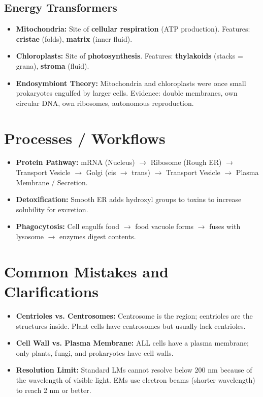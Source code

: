 \documentclass[11pt, a4paper]{article}
\begin{document}
\subsection*{Energy Transformers}
\begin{itemize}
    \item \textbf{Mitochondria:} Site of \textbf{cellular respiration} (ATP production). Features: \textbf{cristae} (folds), \textbf{matrix} (inner fluid).
    \item \textbf{Chloroplasts:} Site of \textbf{photosynthesis}. Features: \textbf{thylakoids} (stacks = grana), \textbf{stroma} (fluid).
    \item \textbf{Endosymbiont Theory:} Mitochondria and chloroplasts were once small prokaryotes engulfed by larger cells. Evidence: double membranes, own circular DNA, own ribosomes, autonomous reproduction.
\end{itemize}

\section*{Processes / Workflows}
\begin{itemize}
    \item \textbf{Protein Pathway:} mRNA (Nucleus) $\rightarrow$ Ribosome (Rough ER) $\rightarrow$ Transport Vesicle $\rightarrow$ Golgi (cis $\rightarrow$ trans) $\rightarrow$ Transport Vesicle $\rightarrow$ Plasma Membrane / Secretion.
    \item \textbf{Detoxification:} Smooth ER adds hydroxyl groups to toxins to increase solubility for excretion.
    \item \textbf{Phagocytosis:} Cell engulfs food $\rightarrow$ food vacuole forms $\rightarrow$ fuses with lysosome $\rightarrow$ enzymes digest contents.
\end{itemize}

\section*{Common Mistakes and Clarifications}
\begin{itemize}
    \item \textbf{Centrioles vs. Centrosomes:} Centrosome is the region; centrioles are the structures inside. Plant cells have centrosomes but usually lack centrioles.
    \item \textbf{Cell Wall vs. Plasma Membrane:} ALL cells have a plasma membrane; only plants, fungi, and prokaryotes have cell walls.
    \item \textbf{Resolution Limit:} Standard LMs cannot resolve below 200 nm because of the wavelength of visible light. EMs use electron beams (shorter wavelength) to reach 2 nm or better.
\end{itemize}
\end{document}
